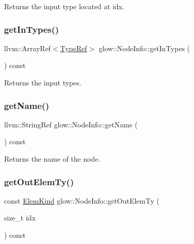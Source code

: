 \begin{DoxyReturn}{Returns}
the input type located at {\ttfamily idx}. 
\end{DoxyReturn}
\mbox{\label{classglow_1_1_node_info_aec9acac75fd1d5cf16ad3337392902c3}} 
\subsubsection{\texorpdfstring{get\+In\+Types()}{getInTypes()}}
{\footnotesize\ttfamily llvm\+::\+Array\+Ref$<$\hyperlink{structglow_1_1_type}{Type\+Ref}$>$ glow\+::\+Node\+Info\+::get\+In\+Types (\begin{DoxyParamCaption}{ }\end{DoxyParamCaption}) const\hspace{0.3cm}{\ttfamily [inline]}}

\begin{DoxyReturn}{Returns}
the input types. 
\end{DoxyReturn}
\mbox{\label{classglow_1_1_node_info_a0c55e6a0f96c6afd990d4d545d8e9000}} 
\subsubsection{\texorpdfstring{get\+Name()}{getName()}}
{\footnotesize\ttfamily llvm\+::\+String\+Ref glow\+::\+Node\+Info\+::get\+Name (\begin{DoxyParamCaption}{ }\end{DoxyParamCaption}) const\hspace{0.3cm}{\ttfamily [inline]}}

\begin{DoxyReturn}{Returns}
the name of the node. 
\end{DoxyReturn}
\mbox{\label{classglow_1_1_node_info_abcd1099dede4ba394348542891e32a30}} 
\subsubsection{\texorpdfstring{get\+Out\+Elem\+Ty()}{getOutElemTy()}}
{\footnotesize\ttfamily const \hyperlink{namespaceglow_ab92e14a94329daf4083db670e95fbcdf}{Elem\+Kind} glow\+::\+Node\+Info\+::get\+Out\+Elem\+Ty (\begin{DoxyParamCaption}\item[{size\+\_\+t}]{idx }\end{DoxyParamCaption}) const\hspace{0.3cm}{\ttfamily [inline]}}

